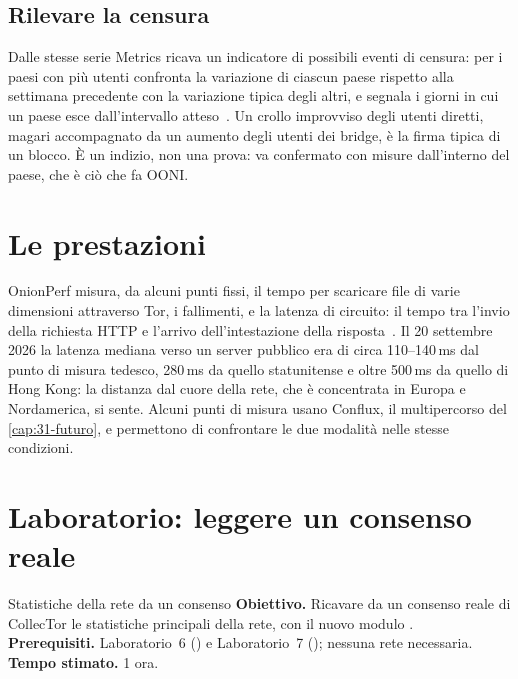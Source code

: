 \subsection{Rilevare la censura}

Dalle stesse serie Metrics ricava un indicatore di possibili eventi di censura: per i paesi con più utenti confronta la variazione di ciascun paese rispetto alla settimana precedente con la variazione tipica degli altri, e segnala i giorni in cui un paese esce dall'intervallo atteso~\cite{metricsreproducible}. Un crollo improvviso degli utenti diretti, magari accompagnato da un aumento degli utenti dei bridge, è la firma tipica di un blocco. È un indizio, non una prova: va confermato con misure dall'interno del paese, che è ciò che fa OONI.

\section{Le prestazioni}\label{sec:metrics-prestazioni}

OnionPerf misura, da alcuni punti fissi, il tempo per scaricare file di varie dimensioni attraverso Tor, i fallimenti, e la latenza di circuito: il tempo tra l'invio della richiesta HTTP e l'arrivo dell'intestazione della risposta~\cite{metricsreproducible}. Il 20 settembre 2026 la latenza mediana verso un server pubblico era di circa 110--140\,ms dal punto di misura tedesco, 280\,ms da quello statunitense e oltre 500\,ms da quello di Hong Kong: la distanza dal cuore della rete, che è concentrata in Europa e Nordamerica, si sente. Alcuni punti di misura usano Conflux, il multipercorso del \cref{cap:31-futuro}, e permettono di confrontare le due modalità nelle stesse condizioni.

\section{Laboratorio: leggere un consenso reale}\label{sec:lab-metrics}

\begin{laboratorio}[15]{Statistiche della rete da un consenso}
\textbf{Obiettivo.} Ricavare da un consenso reale di CollecTor le statistiche principali della rete, con il nuovo modulo .\\
\textbf{Prerequisiti.} Laboratorio~6 () e Laboratorio~7 (); nessuna rete necessaria.\\
\textbf{Tempo stimato.} 1 ora.
\end{laboratorio}

